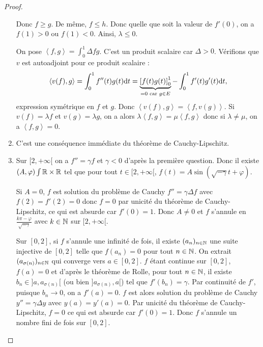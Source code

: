 \documentclass[12pt]{article}
\begin{document}
\begin{proof}
\begin{enumerate}
		Donc $f\geqslant g$. De même, $f\leqslant h$. Donc quelle que soit la valeur de $f'(0)$, on a $f(1)>0$ ou $f(1)<0$. Ainsi, $\lambda\leqslant0$.

		On pose $\left\langle f,g\right\rangle=\int_{0}^{1}\Delta fg$. C'est un produit scalaire car $\Delta>0$. Vérifions que $v$ est autoadjoint pour ce produit scalaire : 
		\begin{equation}
			\left\langle v(f), g\right\rangle=\int_{0}^{1}f''(t)g(t)\mathrm{d} t=\underbrace{\left[f(t)g(t)\right]_{0}^{1}}_{=0\text{ car }g\in E}-\int_{0}^{1}f'(t)g'(t)\mathrm{d} t,
		\end{equation}
		expression symétrique en $f$ et $g$. Donc $\left\langle v(f), g\right\rangle=\left\langle f, v(g)\right\rangle$. Si $v(f)=\lambda f$ et $v(g)=\lambda g$, on a alors $\lambda\left\langle f,g\right\rangle=\mu\left\langle f,g\right\rangle$ donc si $\lambda\neq\mu$, on a $\left\langle f,g\right\rangle=0$.

		\item C'est une conséquence immédiate du théorème de Cauchy-Lipschitz.
		\item Sur $[2,+\infty[$ on a $f''=\gamma f$ et $\gamma<0$ d'après la première question. Donc il existe $(A,\varphi)\int\mathbb{R}\times\mathbb{R}$ tel que pour tout $t\in[2,+\infty[$, $f(t)=A\sin\left(\sqrt{-\gamma}t+\varphi\right)$.
		
		Si $A=0$, $f$ est solution du problème de Cauchy $f''=\gamma\Delta f$ avec $f(2)=f'(2)=0$ donc $f=0$ par unicité du théorème de Cauchy-Lipschitz, ce qui est absurde car $f'(0)=1$. Donc $A\neq0$ et $f$ s'annule en $\frac{k\pi-\varphi}{\sqrt{-\gamma}}$ avec $k\in\mathbb{N}$ sur $[2,+\infty[$.

		Sur $[0,2]$, si $f$ s'annule une infinité de fois, il existe $(a_n)_{n\in\mathbb{N}}$ une suite injective de $[0,2]$ telle que $f(a_n)=0$ pour tout $n\in\mathbb{N}$. On extrait $(a_{\sigma(n)})_{n\in\mathbb{N}}$ qui converge vers $a\in[0,2]$. $f$ étant continue sur $[0,2]$, $f(a)=0$ et d'après le théorème de Rolle, pour tout $n\in\mathbb{N}$, il existe $b_n\in]a,a_{\sigma(n)}[$ (ou bien $]a_{\sigma(n)},a[$) tel que $f'(b_n)=\gamma$. Par continuité de $f'$, puisque $b_n\to0$, on a $f'(a)=0$. $f$ est alors solution du problème de Cauchy $y''=\gamma\Delta y$ avec $y(a)=y'(a)=0$. Par unicité du théorème de Cauchy-Lipschitz, $f=0$ ce qui est absurde car $f'(0)=1$. Donc $f$ s'annule un nombre fini de fois sur $[0,2]$.


\end{enumerate}
\end{proof}
\end{document}
